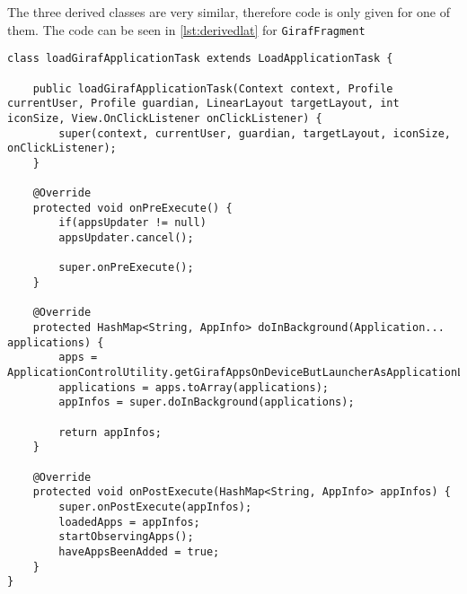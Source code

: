  The three derived classes are very similar, therefore code is only given for one of them.
 The code can be seen in \cref{lst:derivedlat} for \lstinline!GirafFragment! 
 
  \begin{lstlisting}[caption={The loadGirafApplicationTask, derived from LoadApplicationTask. This is the derived class used by GirafFragment to load applications into view. Please note that all comments have been removed to make the listing smaller}, label={lst:derivedlat}]
class loadGirafApplicationTask extends LoadApplicationTask {

	public loadGirafApplicationTask(Context context, Profile currentUser, Profile guardian, LinearLayout targetLayout, int iconSize, View.OnClickListener onClickListener) {
		super(context, currentUser, guardian, targetLayout, iconSize, onClickListener);
	}
	
	@Override
	protected void onPreExecute() {
		if(appsUpdater != null)
		appsUpdater.cancel();
		
		super.onPreExecute();
	}
	
	@Override
	protected HashMap<String, AppInfo> doInBackground(Application... applications) {
		apps = ApplicationControlUtility.getGirafAppsOnDeviceButLauncherAsApplicationList(context);
		applications = apps.toArray(applications);
		appInfos = super.doInBackground(applications);
		
		return appInfos;
	}
	
	@Override
	protected void onPostExecute(HashMap<String, AppInfo> appInfos) {
		super.onPostExecute(appInfos);
		loadedApps = appInfos;
		startObservingApps();
		haveAppsBeenAdded = true;
	}
}
\end{lstlisting}